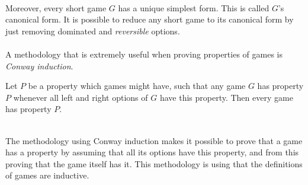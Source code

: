 ~\\
Moreover, every short game $G$ has a unique simplest form. This is called $G$'s canonical form{\cite[p.~78]{lip}}. It is possible to reduce any short game to its canonical form by just removing dominated and \emph{reversible} options{\cite[p.~111]{onag}}.
\\\\
A methodology that is extremely useful when proving properties of games is \emph{Conway induction}.
\begin{thm}
\label{thm:conind}
Let $P$ be a property which games might have, such that any game $G$ has property $P$ whenever all left and right options of $G$ have this property. Then every game has property $P$.
\end{thm}
~\\
The methodology using Conway induction makes it possible to prove that a game has a property by assuming that all its options have this property, and from this proving that the game itself has it. This methodology is using that the definitions of games are inductive.
